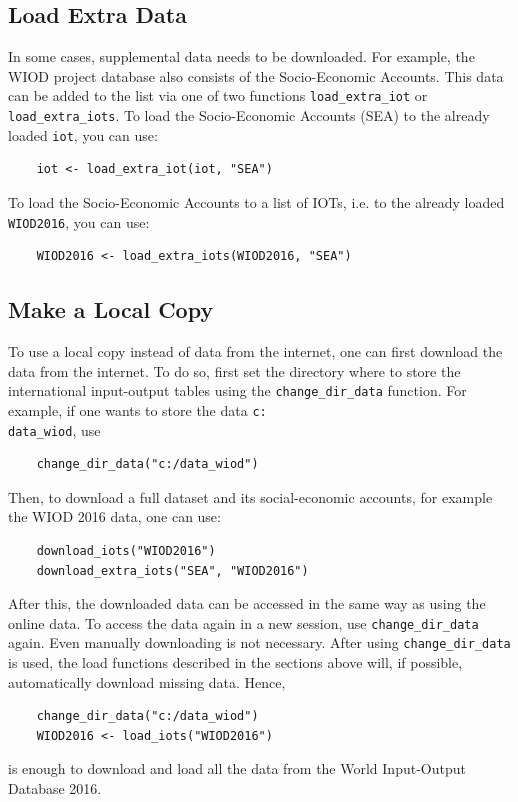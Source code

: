 \documentclass[10pt,a4paper]{paper}
\begin{document}
	\subsection{Load Extra Data}
	In some cases, supplemental data needs to be downloaded. For example, the WIOD project database also consists of the Socio-Economic Accounts. This data can be added to the list via one of two functions \texttt{load\_extra\_iot} or \texttt{load\_extra\_iots}. To load the Socio-Economic Accounts (SEA) to the already loaded \texttt{iot}, you can use:
	\begin{Verbatim}
	iot <- load_extra_iot(iot, "SEA")
	\end{Verbatim} 
	To load the Socio-Economic Accounts to a list of IOTs, i.e. to the already loaded \texttt{WIOD2016}, you can use:
	\begin{Verbatim}
	WIOD2016 <- load_extra_iots(WIOD2016, "SEA")
	\end{Verbatim}
	
	\subsection{Make a Local Copy}
	To use a local copy instead of data from the internet, one can first download the data from the internet. To do so, first set the directory where to store the international input-output tables using the \texttt{change\_dir\_data} function. For example, if one wants to store the data \texttt{c:\\data\_wiod}, use
	\begin{Verbatim}
	change_dir_data("c:/data_wiod")
	\end{Verbatim}
	Then, to download a full dataset and its social-economic accounts, for example the WIOD 2016 data, one can use:
	\begin{Verbatim}
	download_iots("WIOD2016")
	download_extra_iots("SEA", "WIOD2016")
	\end{Verbatim}
	After this, the downloaded data can be accessed in the same way as using the online data. To access the data again in a new session, use \texttt{change\_dir\_data} again. Even manually downloading is not necessary. After using \texttt{change\_dir\_data} is used, the load functions described in the sections above will, if possible, automatically download missing data. Hence,
	\begin{Verbatim}
	change_dir_data("c:/data_wiod")
	WIOD2016 <- load_iots("WIOD2016")
	\end{Verbatim}
	is enough to download and load all the data from the World Input-Output Database 2016.
	
\end{document}
